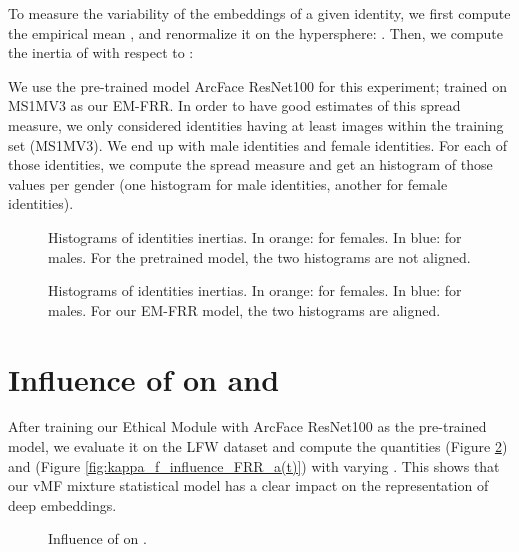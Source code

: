 \documentclass[nohyperref]{article}
\theoremstyle{plain}
\theoremstyle{definition}
\theoremstyle{remark}
\begin{document}
To measure the variability of the embeddings  of a given identity, we first compute the empirical mean , and renormalize it on the hypersphere: . Then, we compute the inertia of  with respect to :



We use the pre-trained model ArcFace ResNet100 for this experiment; trained on MS1MV3 as our EM-FRR. In order to have good estimates of this spread measure, we only considered identities having at least  images within the training set (MS1MV3). We end up with  male identities and  female identities. For each of those identities, we compute the spread measure and get an histogram of those values per gender (one histogram for male identities, another for female identities).

\begin{figure}[h]
    \centering
    
    \caption{Histograms of identities inertias. In orange: for females. In blue: for males. For the pretrained model, the two histograms are not aligned.}
    \hspace{0.2cm}

    \caption{Histograms of identities inertias. In orange: for females. In blue: for males. For our EM-FRR model, the two histograms are aligned.}    \label{}
\end{figure}






\section{Influence of  on  and }

After training our Ethical Module with ArcFace ResNet100 as the pre-trained model, we evaluate it on the LFW dataset and compute the quantities  (Figure \ref{fig:kappa_f_influence_FAR_a(t)}) and  (Figure \ref{fig:kappa_f_influence_FRR_a(t)}) with varying . This shows that our vMF mixture statistical model has a clear impact on the representation of deep embeddings.



\begin{figure}[h]
    \centering
     \hspace{2cm}
   \caption{Influence of  on .}    \label{fig:kappa_f_influence_FAR_a(t)}
\end{figure}
\end{document}
